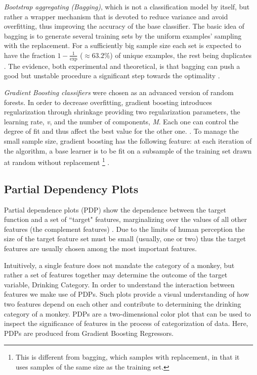 	\textit{Bootstrap aggregating (Bagging)}, which is not a classification model by itself, but rather a wrapper mechanism that is devoted to reduce variance and avoid overfitting, thus improving the accuracy of the base classifier. The basic idea of bagging is to generate several training sets by the uniform examples' sampling with the replacement. For a sufficiently big sample size each set is expected to have the fraction $1-\frac{1}{\exp}$ ($\approx 63.2 \%$) of unique examples, the rest being duplicates .	The evidence, both experimental and theoretical, is that bagging can push a good but unstable procedure a significant step towards the optimality . 
	
	\textit{Gradient Boosting classifiers} were chosen as an advanced version of random forests. In order to decrease overfitting, gradient boosting introduces regularization through shrinkage providing
	two regularization parameters, the learning rate, \textit{v}, and the number of components, \textit{M}. Each one can control the degree of fit and thus affect the best value for the other one. . To manage the small sample size, gradient boosting has the following feature: at each iteration of the algorithm, a base learner is to be fit on a subsample of the training set drawn at random without replacement \footnote{This is different from bagging, which samples with replacement, in that it uses samples of the same size as the training set.} .	
	
	\subsection{Partial Dependency Plots}
	Partial dependence plots (PDP) show the dependence between the target function and a set of ``target" features, marginalizing over the values of all other features (the complement features) . Due to the limits of human perception the size of the target feature set must be small (usually, one or two) thus the target features are usually chosen among the most important features. 
	
	Intuitively, a single feature does not mandate the category of a monkey, but rather a set of features together may determine the outcome of the target variable, Drinking Category. In order to understand the interaction between features we make use of PDPs. Such plots provide a visual understanding of how two features depend on each other and contribute to determining the drinking category of a monkey. PDPs are a two-dimensional color plot that can be used to inspect the significance of features in the process of categorization of data. Here, PDPs are produced from Gradient Boosting Regressors. 

